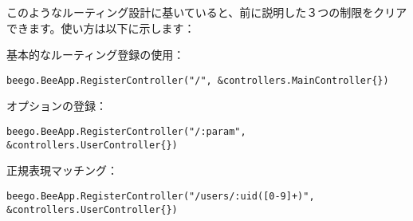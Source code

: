 このようなルーティング設計に基いていると、前に説明した３つの制限をクリアできます。使い方は以下に示します：

基本的なルーティング登録の使用：

\begin{lstlisting}[numbers=none]
beego.BeeApp.RegisterController("/", &controllers.MainController{})
\end{lstlisting}

オプションの登録：



\begin{lstlisting}[numbers=none]
beego.BeeApp.RegisterController("/:param", &controllers.UserController{})
\end{lstlisting}

正規表現マッチング：

\begin{lstlisting}[numbers=none]
beego.BeeApp.RegisterController("/users/:uid([0-9]+)", &controllers.UserController{})
\end{lstlisting}


